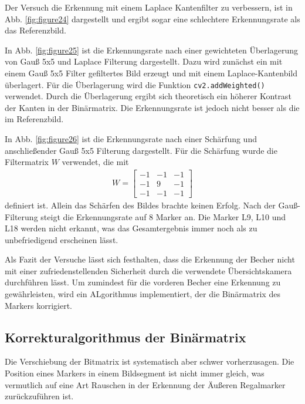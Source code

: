     Der Versuch die Erkennung mit einem Laplace Kantenfilter zu verbessern, ist in Abb. \ref{fig:figure24} dargestellt und ergibt sogar eine schlechtere Erkennungsrate als das Referenzbild.
    
    In Abb. \ref{fig:figure25} ist die Erkennungsrate nach einer gewichteten Überlagerung von Gauß 5x5 und Laplace Filterung dargestellt. 
    Dazu wird zunächst ein mit einem Gauß 5x5 Filter gefiltertes Bild erzeugt und mit einem Laplace-Kantenbild überlagert. 
    Für die Überlagerung wird die Funktion \verb|cv2.addWeighted()| verwendet. 
    Durch die Überlagerung ergibt sich theoretisch ein höherer Kontrast der Kanten in der Binärmatrix. 
    Die Erkennungsrate ist jedoch nicht besser als die im Referenzbild.

    In Abb. \ref{fig:figure26} ist die Erkennungsrate nach einer Schärfung und anschließender Gauß 5x5 Filterung dargestellt.
    Für die Schärfung wurde die Filtermatrix $W$ verwendet, die mit 
    \begin{align*}
        W = \begin{bmatrix}
            -1 & -1 & -1 \\
            -1 & 9 & -1 \\
            -1 & -1 & -1
        \end{bmatrix}
    \end{align*}
    definiert ist. Allein das Schärfen des Bildes brachte keinen Erfolg. Nach der Gauß-Filterung steigt die Erkennungsrate auf 8 Marker an. 
    Die Marker L9, L10 und L18 werden nicht erkannt, was das Gesamtergebnis immer noch als zu unbefriedigend erscheinen lässt.

    Als Fazit der Versuche lässt sich festhalten, dass die Erkennung der Becher nicht mit einer zufriedenstellenden Sicherheit durch die verwendete Übersichtskamera durchführen lässt.
    Um zumindest für die vorderen Becher eine Erkennung zu gewährleisten, wird ein ALgorithmus implementiert, der die Binärmatrix des Markers korrigiert.
    \clearpage

    \subsection{Korrekturalgorithmus der Binärmatrix}\label{ChapKorrekturalgorithmus}

    Die Verschiebung der Bitmatrix ist systematisch aber schwer vorherzusagen. Die Position eines Markers in einem Bildsegment ist nicht immer gleich, was vermutlich auf eine Art Rauschen in der Erkennung der 
    Äußeren Regalmarker zurückzuführen ist.

